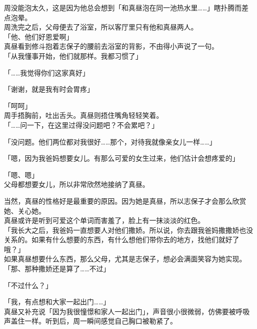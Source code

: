 周没能泡太久，这是因为他总会想到「和真昼泡在同一池热水里……」瞎扑腾而差点泡晕。\\

周洗完之后，父母便去了浴室，所以客厅里只有他和真昼两人。\\

「他、他们好恩爱啊」\\

真昼看到修斗抱着志保子的腰前去浴室的背影，不由得小声说了一句。\\

「从我懂事开始，他们就那样。我都习惯了」

「……我觉得你们这家真好」

「谢谢，就是我有时会胃疼」

「呵呵」\\

周手捂胸前，吐出舌头。真昼则捂住嘴角轻轻笑着。\\

「……问一下，在这里过得没问题吧？不会累吧？」

「没问题。他们两位都对我很好……那个，对待我就像亲女儿一样……」

「嗯，因为我爸妈想要女儿。有那么可爱的女生过来，他们估计会想疼爱的」

「嗯、嗯」\\

父母都想要女儿，所以非常欣然地接纳了真昼。

当然，真昼的性格好是最重要的原因。因为她是真昼，所以志保子才会那么欣赏她、关心她。\\

真昼或许是听到可爱这个单词而害羞了，脸上有一抹淡淡的红色。\\

「我长大之后，我爸妈一直想要人对他们撒娇。所以说，你去跟我爸妈撒撒娇也没关系的。如果有什么想要的东西，有什么想他们带你去的地方，找他们就好了哦？」\\

如果真昼想要什么东西，那么父母，尤其是志保子，想必会满面笑容为她实现。\\

「那、那种撒娇还是算了……不过」

「不过什么？」

「我，有点想和大家一起出门……」\\

真昼又补充说「因为我很憧憬和家人一起出门」，声音很小很微弱，仿佛要被呼吸声盖住一样。听到后，周一瞬间感觉自己胸口被勒紧了。\\

